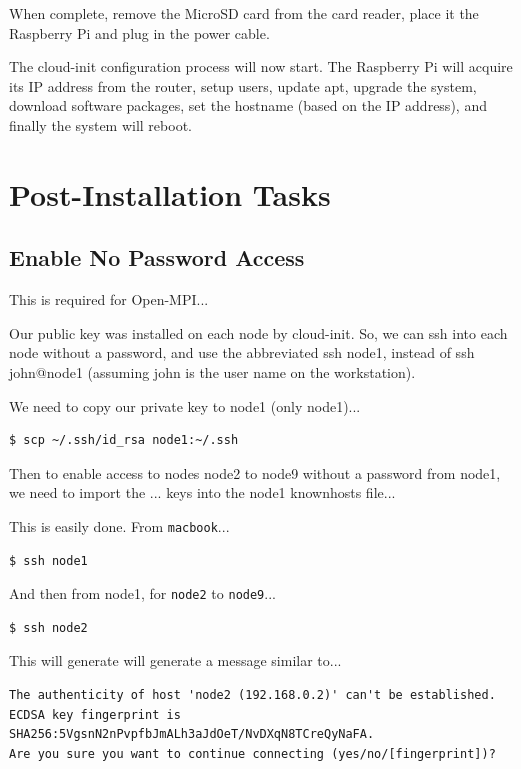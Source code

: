 \documentclass{report}
\begin{document}
When complete, remove the MicroSD card from the card reader, place it the Raspberry Pi and plug in the power cable.

The cloud-init configuration process will now start. The Raspberry Pi will acquire its IP address from the router, setup users, update apt, upgrade the system, download software packages, set the hostname (based on the IP address), and finally the system will reboot.


%
%
\clearpage\section{Post-Installation Tasks}

\subsection{Enable No Password Access}

This is required for Open-MPI...

Our public key was installed on each node by cloud-init. So, we can ssh into each node without a password, and use the abbreviated ssh node1, instead of ssh john@node1 (assuming john is the user name on the workstation).

We need to copy our private key to node1 (only node1)...

\lstset{style=type}
\begin{lstlisting}
$ scp ~/.ssh/id_rsa node1:~/.ssh
\end{lstlisting}

Then to enable access to nodes node2 to node9 without a password from node1, we need to import the ... keys into the node1 knownhosts file...

This is easily done. From \verb|macbook|...

\lstset{style=type}
\begin{lstlisting}[]
$ ssh node1
\end{lstlisting}

And then from node1, for \verb|node2| to \verb|node9|...

\lstset{style=type}
\begin{lstlisting}[]
$ ssh node2
\end{lstlisting}

This will generate will generate a message similar to...

\lstset{style=type}
\begin{lstlisting}[]
The authenticity of host 'node2 (192.168.0.2)' can't be established.
ECDSA key fingerprint is SHA256:5VgsnN2nPvpfbJmALh3aJdOeT/NvDXqN8TCreQyNaFA.
Are you sure you want to continue connecting (yes/no/[fingerprint])?
\end{lstlisting}
\end{document}
